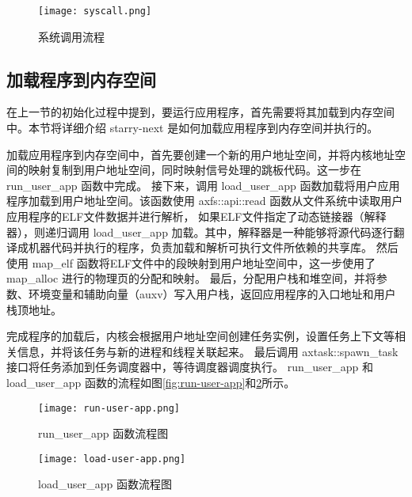 \begin{figure}[H]
    \centering
    \texttt{[image: syscall.png]}
    \caption{系统调用流程}
    \label{fig:syscall}
\end{figure}

\subsection{加载程序到内存空间}

在上一节的初始化过程中提到，要运行应用程序，首先需要将其加载到内存空间中。本节将详细介绍 starry-next 是如何加载应用程序到内存空间并执行的。

加载应用程序到内存空间中，首先要创建一个新的用户地址空间，并将内核地址空间的映射复制到用户地址空间，同时映射信号处理的跳板代码。这一步在 run\_user\_app 函数中完成。
接下来，调用 load\_user\_app 函数加载将用户应用程序加载到用户地址空间。该函数使用 axfs::api::read 函数从文件系统中读取用户应用程序的ELF文件数据并进行解析，
如果ELF文件指定了动态链接器（解释器），则递归调用 load\_user\_app 加载。其中，解释器是一种能够将源代码逐行翻译成机器代码并执行的程序，负责加载和解析可执行文件所依赖的共享库。
然后使用 map\_elf 函数将ELF文件中的段映射到用户地址空间中，这一步使用了 map\_alloc 进行的物理页的分配和映射。
最后，分配用户栈和堆空间，并将参数、环境变量和辅助向量（auxv）写入用户栈，返回应用程序的入口地址和用户栈顶地址。

完成程序的加载后，内核会根据用户地址空间创建任务实例，设置任务上下文等相关信息，并将该任务与新的进程和线程关联起来。
最后调用 axtask::spawn\_task 接口将任务添加到任务调度器中，等待调度器调度执行。
run\_user\_app 和 load\_user\_app 函数的流程如图\ref{fig:run-user-app}和\ref{fig:load-user-app}所示。

\begin{figure}
\centering %
\begin{minipage}[b]{0.3\textwidth} %
\centering %
\texttt{[image: run-user-app.png]} %
\caption{run\_user\_app 函数流程图}
\label{fig:run-user-app}
\end{minipage}
\begin{minipage}[b]{0.65\textwidth} %
\centering %
\texttt{[image: load-user-app.png]}%
\caption{load\_user\_app 函数流程图}
\label{fig:load-user-app}
\end{minipage}
\end{figure}


